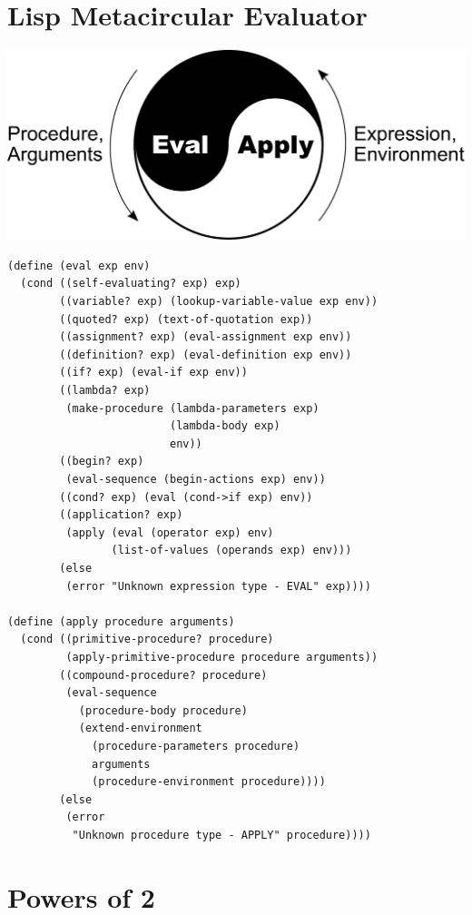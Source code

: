 \documentclass[10pt,twoside,openright]{memoir}
\begin{document}
\chapter{Lisp Metacircular Evaluator}

\begin{center}
\includegraphics[scale=0.25]{figures/eval-apply.pdf}
\end{center}

{\footnotesize
\begin{verbatim}
(define (eval exp env)
  (cond ((self-evaluating? exp) exp)
        ((variable? exp) (lookup-variable-value exp env))
        ((quoted? exp) (text-of-quotation exp))
        ((assignment? exp) (eval-assignment exp env))
        ((definition? exp) (eval-definition exp env))
        ((if? exp) (eval-if exp env))
        ((lambda? exp)
         (make-procedure (lambda-parameters exp)
                         (lambda-body exp)
                         env))
        ((begin? exp) 
         (eval-sequence (begin-actions exp) env))
        ((cond? exp) (eval (cond->if exp) env))
        ((application? exp)
         (apply (eval (operator exp) env)
                (list-of-values (operands exp) env)))
        (else
         (error "Unknown expression type - EVAL" exp))))  

(define (apply procedure arguments)
  (cond ((primitive-procedure? procedure)
         (apply-primitive-procedure procedure arguments))
        ((compound-procedure? procedure)
         (eval-sequence
           (procedure-body procedure)
           (extend-environment
             (procedure-parameters procedure)
             arguments
             (procedure-environment procedure))))
        (else
         (error
          "Unknown procedure type - APPLY" procedure))))  
\end{verbatim}
}


\chapter{Powers of 2}
\end{document}
